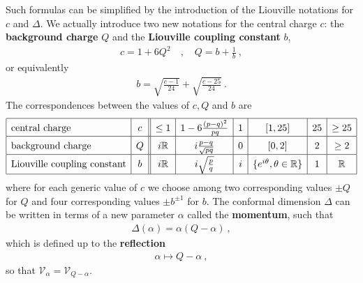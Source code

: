 \documentclass[12pt,a4paper,notitlepage]{report}
\numberwithin{equation}{section}
\theoremstyle{break}
\begin{document}
Such formulas can be simplified by the introduction of the Liouville notations for $c$ and $\Delta$.
We actually introduce two new notations for the central charge $c$: the \textbf{\boldmath background charge} $Q$ and the \textbf{\boldmath Liouville coupling constant} $b$,
\begin{align}
\boxed{ c= 1+6Q^2 }\quad , \quad \boxed{Q = b+\frac{1}{b}}\ ,
\label{cqb}
\end{align}
or equivalently
\begin{align}
 b = \sqrt{\frac{c-1}{24}} + \sqrt{\frac{c-25}{24}}\ .
\end{align}
The correspondences between the values of $c,Q$ and $b$ are 
\begin{align}
\renewcommand{\arraystretch}{1.5}
 \begin{array}{|l|c||c|c|c|c|c|c|}
  \hline
  \text{central\ charge} & c & \leq 1 & 1-6\frac{(p-q)^2}{pq} & 1 & [1,25] & 25 & \geq 25 
\\
\hline
\text{background\ charge} & Q & i{\mathbb{R}} & i\frac{p-q}{\sqrt{pq}} & 0 & [0,2] & 2 & \geq 2 
\\
\hline
\text{Liouville\ coupling\ constant} &
b& i{\mathbb{R}} & i\sqrt{\frac{p}{q}} & i & \{e^{i\theta},\theta\in{\mathbb{R}}\} & 1 & {\mathbb{R}}
\\
\hline
 \end{array}
\label{cqbval}
\end{align}
where for each generic value of $c$ we choose among two corresponding values $\pm Q$ for $Q$ and four corresponding values $\pm b^{\pm 1}$ for $b$.
The conformal dimension $\Delta$ can be written in terms of a 
new parameter $\alpha$ called the \textbf{\boldmath momentum}, such that 
\begin{align}
 \boxed{\Delta(\alpha) = \alpha(Q-\alpha)}\ ,
\label{daq}
\end{align}
which is defined up to the \textbf{\boldmath reflection}
\begin{align}
 \alpha \mapsto Q-\alpha\ ,
\label{arqa}
\end{align}
so that $\mathcal{V}_\alpha = \mathcal{V}_{Q-\alpha}$.
\end{document}
